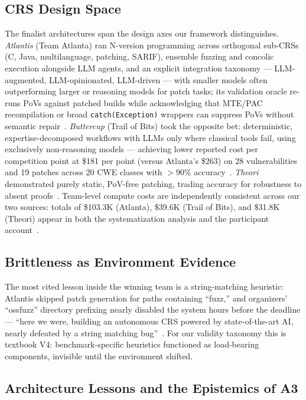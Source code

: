 \documentclass[conference,compsoc]{IEEEtran}
\begin{document}
\subsection{CRS Design Space}
The finalist architectures span the design axes our framework distinguishes.
\emph{Atlantis} (Team Atlanta) ran N-version programming across orthogonal sub-CRSs (C, Java,
multilanguage, patching, SARIF), ensemble fuzzing and concolic execution alongside LLM agents,
and an explicit integration taxonomy --- LLM-augmented, LLM-opinionated, LLM-driven ---
with smaller models often outperforming larger or reasoning models for patch tasks; its
validation oracle re-runs PoVs against patched builds while acknowledging that MTE/PAC
recompilation or broad \texttt{catch(Exception)} wrappers can suppress PoVs without semantic
repair~\cite{taafc2025}. \emph{Buttercup} (Trail of Bits) took the opposite bet:
deterministic, expertise-decomposed workflows with LLMs only where classical tools fail,
using exclusively non-reasoning models --- achieving lower reported cost per competition point at
\$181 per point (versus Atlanta's \$263) on 28 vulnerabilities and 19 patches across 20 CWE
classes with ${>}90\%$ accuracy~\cite{tobbuttercup2025,r7sokaixcc2026}. \emph{Theori}
demonstrated purely static, PoV-free patching, trading accuracy for robustness to absent
proofs~\cite{taafc2025}. Team-level compute costs are independently consistent across our two
sources: totals of \$103.3K (Atlanta), \$39.6K (Trail of Bits), and \$31.8K (Theori) appear in
both the systematization analysis and the participant account~\cite{r7sokaixcc2026,tobbuttercup2025}.

\subsection{Brittleness as Environment Evidence}
The most cited lesson inside the winning team is a string-matching heuristic: Atlantis skipped
patch generation for paths containing ``fuzz,'' and organizers' ``ossfuzz'' directory prefixing
nearly disabled the system hours before the deadline --- ``here we were, building an autonomous
CRS powered by state-of-the-art AI, nearly defeated by a string matching bug''~\cite{taafc2025}.
For our validity taxonomy this is textbook V4: benchmark-specific heuristics functioned as
load-bearing components, invisible until the environment shifted.

\subsection{Architecture Lessons and the Epistemics of A3}
\end{document}
